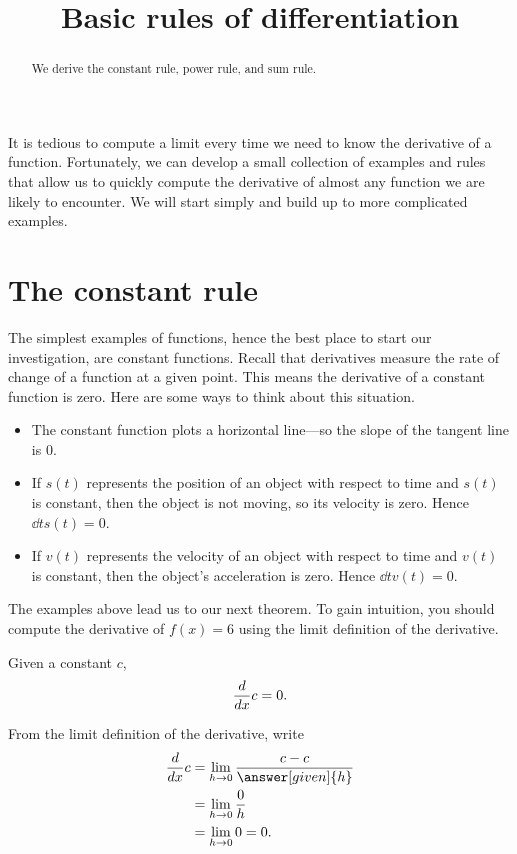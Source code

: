 \documentclass{ximera}
\title[Dig-In:]{Basic rules of differentiation}
\begin{document}
\begin{abstract}
  We derive the constant rule, power rule, and sum rule. 
\end{abstract}
\maketitle

It is tedious to compute a limit every time we need to know the
derivative of a function.  Fortunately, we can develop a small
collection of examples and rules that allow us to quickly compute the
derivative of almost any function we are likely to encounter.  We will
start simply and build up to more complicated examples.


\section{The constant rule}

The simplest examples of functions, hence the best place to start our
investigation, are constant functions.  Recall that derivatives
measure the rate of change of a function at a given point. This means the
derivative of a constant function is zero. Here are some ways to think about
this situation.
\begin{itemize}
\item The constant function plots a horizontal line---so the slope of
  the tangent line is $0$.
\item If $s(t)$ represents the position of an object with respect to
  time and $s(t)$ is constant, then the object is not moving, so its
  velocity is zero. Hence $\dd{t} s(t) = 0$.
\item If $v(t)$ represents the velocity of an object with respect to
  time and $v(t)$ is constant, then the object's acceleration is
  zero. Hence $\dd{t} v(t) = 0$.
\end{itemize}
The examples above lead us to our next theorem.
To gain intuition, you should compute the derivative of
  $f(x) = 6$ using the limit definition of the derivative.

\begin{theorem}
Given a constant $c$,
\[
\frac{d}{\mathop{}\!d x} c = 0.
\]

\begin{explanation}
From the limit definition of the derivative, write
\begin{align*}
\ddx c &= \lim_{h\to 0}\frac{c-c}{\answer[given]{h}}\\
&= \lim_{h\to 0} \frac{0}{h}\\
&= \lim_{h\to 0} 0 = 0.
\end{align*}
\end{explanation}
\end{theorem}
\end{document}
